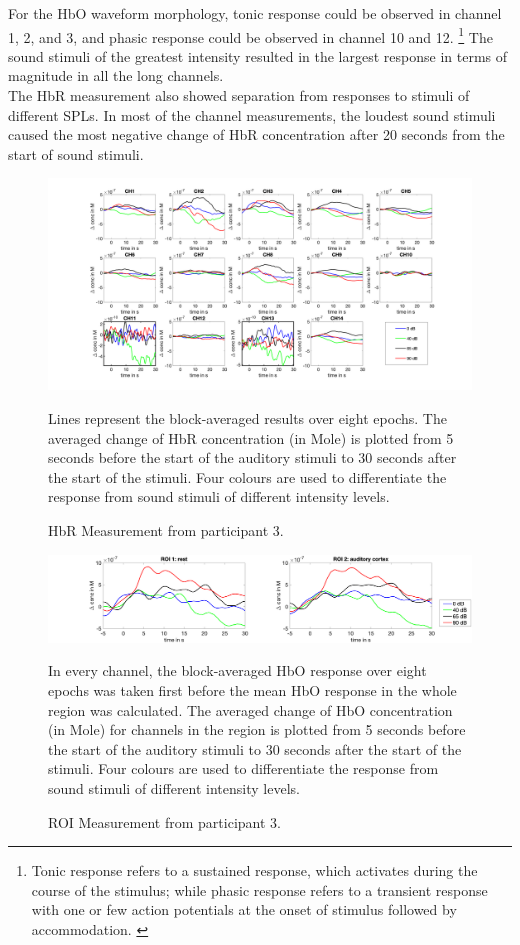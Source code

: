 For the HbO waveform morphology, tonic response could be observed in channel 1, 2, and 3, and phasic response could be observed in channel 10 and 12. \footnote {Tonic response refers to a sustained response, which activates during the course of the stimulus; while phasic response refers to a transient response with one or few action potentials at the onset of stimulus followed by accommodation. \citep {Wang2014IonicMU}} The sound stimuli of the greatest intensity resulted in the largest response in terms of magnitude in all the long channels. \\

The HbR measurement also showed separation from responses to stimuli of different SPLs. In most of the channel measurements, the loudest sound stimuli caused the most negative change of HbR concentration after 20 seconds from the start of sound stimuli. 

\newpage

\begin{figure}[H]
  \centering
    \includegraphics[scale=.4]{bilder/HbR_Mole/sub_jonas_s_HbR.png}
  \caption{HbR Measurement from participant 3.}
  \label{fig:somesignal}
  \medskip
  \footnotesize {Lines represent the block-averaged results over eight epochs. The averaged change of HbR concentration (in Mole) is plotted from 5 seconds before the start of the auditory stimuli to 30 seconds after the start of the stimuli. Four colours are used to differentiate the response from sound stimuli of different intensity levels.}
\end{figure}


\begin{figure}[H]
  \centering
    \includegraphics[scale=.3]{bilder/ROI/sub_jonas_s_HbO.png}
  \caption{ROI Measurement from participant  3.}
  \medskip
  \footnotesize {In every channel, the block-averaged HbO response over eight epochs was taken first before the mean HbO response in the whole region was calculated. The averaged change of HbO concentration (in Mole) for channels in the region is plotted from 5 seconds before the start of the auditory stimuli to 30 seconds after the start of the stimuli. Four colours are used to differentiate the response from sound stimuli of different intensity levels.}
\end{figure}

